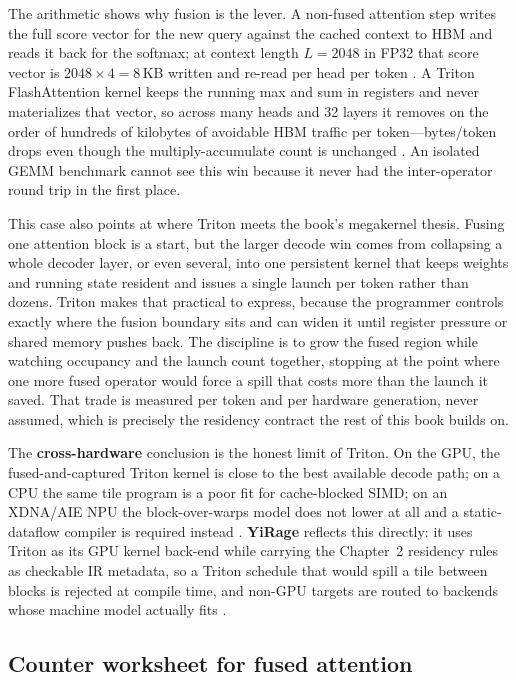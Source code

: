 The arithmetic shows why fusion is the lever. A non-fused attention step writes the full score vector for the new query against the cached context to HBM and reads it back for the softmax; at context length $L{=}2048$ in FP32 that score vector is $2048 \times 4 = 8\,$KB written and re-read per head per token \citep{dao2022flashattention}. A Triton FlashAttention kernel keeps the running max and sum in registers and never materializes that vector, so across many heads and 32 layers it removes on the order of hundreds of kilobytes of avoidable HBM traffic per token---bytes/token drops even though the multiply-accumulate count is unchanged \citep{taxbreak2026,memoryfloor2026}. An isolated GEMM benchmark cannot see this win because it never had the inter-operator round trip in the first place.

This case also points at where Triton meets the book's megakernel thesis. Fusing one attention block is a start, but the larger decode win comes from collapsing a whole decoder layer, or even several, into one persistent kernel that keeps weights and running state resident and issues a single launch per token rather than dozens. Triton makes that practical to express, because the programmer controls exactly where the fusion boundary sits and can widen it until register pressure or shared memory pushes back. The discipline is to grow the fused region while watching occupancy and the launch count together, stopping at the point where one more fused operator would force a spill that costs more than the launch it saved. That trade is measured per token and per hardware generation, never assumed, which is precisely the residency contract the rest of this book builds on.

The \textbf{cross-hardware} conclusion is the honest limit of Triton. On the GPU, the fused-and-captured Triton kernel is close to the best available decode path; on a CPU the same tile program is a poor fit for cache-blocked SIMD; on an XDNA/AIE NPU the block-over-warps model does not lower at all and a static-dataflow compiler is required instead \citep{amd2024xdna,amd2024aie,dlbook}. \textbf{YiRage} reflects this directly: it uses Triton as its GPU kernel back-end while carrying the Chapter~2 residency rules as checkable IR metadata, so a Triton schedule that would spill a tile between blocks is rejected at compile time, and non-GPU targets are routed to backends whose machine model actually fits \citep{yirage2026}.

\subsection{Counter worksheet for fused attention}

